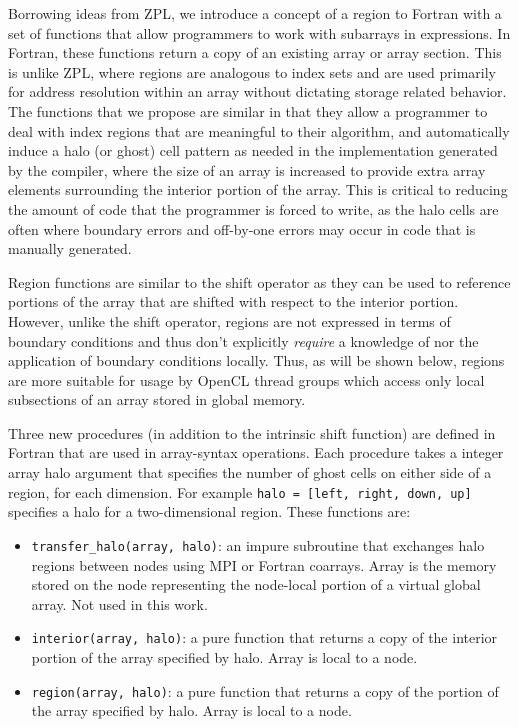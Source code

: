 Borrowing ideas from ZPL, we introduce a concept of a region to
Fortran with a set of functions that allow programmers to work with
subarrays in expressions.  In Fortran, these functions return a copy
of an existing array or array section.  This is unlike ZPL, where
regions are analogous to index sets and are used primarily for address
resolution within an array without dictating storage related behavior.
The functions that we propose are similar in that they allow a
programmer to deal with index regions that are meaningful to their
algorithm, and automatically induce a halo (or ghost) cell pattern as
needed in the implementation generated by the compiler, where the size
of an array is increased to provide extra array elements surrounding
the interior portion of the array.  This is critical to reducing the
amount of code that the programmer is forced to write, as the halo cells
are often where boundary errors and off-by-one errors may occur in code
that is manually generated.

Region functions are similar to the shift operator as they can be used
to reference portions of the array that are shifted with respect to
the interior portion.  However, unlike the shift operator, regions are
not expressed in terms of boundary conditions and thus don't
explicitly \emph{require} a knowledge of nor the application of
boundary conditions locally.  Thus, as will be shown below, regions
are more suitable for usage by OpenCL thread groups which access only
local subsections of an array stored in global memory.

Three new procedures (in addition to the intrinsic shift function) are
defined in Fortran that are used in array-syntax operations.  Each
procedure takes a integer array halo argument that specifies the
number of ghost cells on either side of a region, for each dimension.
For example {\tt halo = [left, right, down, up]} specifies a halo for
a two-dimensional region.  These functions are:

\begin{itemize}

\item {\tt transfer\_halo(array, halo)}: an impure subroutine that
  exchanges halo regions between nodes using MPI or Fortran
  coarrays. Array is the memory stored on the node representing the
  node-local portion of a virtual global array. Not used in this work.

\item {\tt interior(array, halo)}: a pure function that returns a copy of
  the interior portion of the array specified by halo. Array is
  local to a node.

\item {\tt region(array, halo)}: a pure function that returns a copy of
  the portion of the array specified by halo.  Array is local to a node.

\end{itemize}

